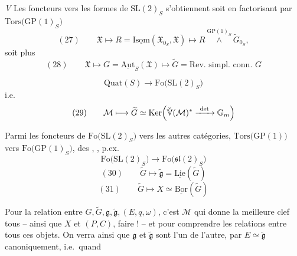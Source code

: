 \documentclass[11pt,a4paper]{article}
\begin{document}
\emph{V} Les foncteurs vers les formes de $\mathrm{SL}(2)_S$ s'obtiennent
soit en factorisant par $\mathrm{Tors}\bigl(\mathrm{GP}(1)_S\bigr)$
\[
  (27) \qquad \mathfrak{X} \longmapsto R = \underline{\mathrm{Isom}}(\mathfrak{X}_{0_S}, \mathfrak{X})
  \longmapsto R \overset{\mathrm{GP}(1)_S}{\wedge} \widetilde{G}_{0_S} ,
\]
soit plus  \ill{}
\[
  (28) \qquad \mathfrak{X} \longmapsto G = \underline{\mathrm{Aut}}_S(\mathfrak{X})
  \longmapsto \widetilde{G} = \text{Rev.\ simpl.\ conn.\ } G
\]

 
\struck{\ill{}}
\[
  \mathrm{Quat}(S) \longrightarrow \mathrm{Fo}\bigl(\mathrm{SL}(2)_S\bigr)
\]
i.e.\ 
\[
  (29) \qquad \mathcal{M} \longmapsto \widetilde{G} \simeq
  \mathrm{Ker}\Bigl(\check{\mathbb{V}}(\mathcal{M})^{*} \xrightarrow{\ \det\ } \mathbb{G}_m\Bigr)
\]

Parmi les foncteurs de $\mathrm{Fo}\bigl(\mathrm{SL}(2)_S\bigr)$ vers les autres
catégories, \ill{}   $\mathrm{Tors}\bigl(\mathrm{GP}(1)\bigr)$
\ill{} vers $\mathrm{Fo}\bigl(\mathrm{GP}(1)_S\bigr)$,  des
,   \ill{}, p.ex.
\[
  \mathrm{Fo}\bigl(\mathrm{SL}(2)_S\bigr) \longrightarrow \mathrm{Fo}\bigl(\mathfrak{sl}(2)_S\bigr)
\]
\[
  (30) \qquad \widetilde{G} \longmapsto \widetilde{\mathfrak{g}} = \underline{\mathrm{Lie}}(\widetilde{G})
\]
\[
  (31) \qquad \widetilde{G} \longmapsto X \simeq \underline{\mathrm{Bor}}(\widetilde{G})
\]

Pour la relation \struck{\ill{}} entre $G, \widetilde{G}, \mathfrak{g},
\widetilde{\mathfrak{g}}, (E, q, \omega)$, c'est $\mathcal{M}$ qui donne
 la meilleure clef   tous
-- ainsi que $X$ et $(P, C)$,  faire ! -- et pour comprendre les
relations entre tous ces objets. On verra ainsi que $\mathfrak{g}$ et
$\widetilde{\mathfrak{g}}$ sont \ill{}  l'un de l'autre, par
$E \simeq \widetilde{\mathfrak{g}}$ canoniquement, i.e.\ quand \ill{}
\end{document}
